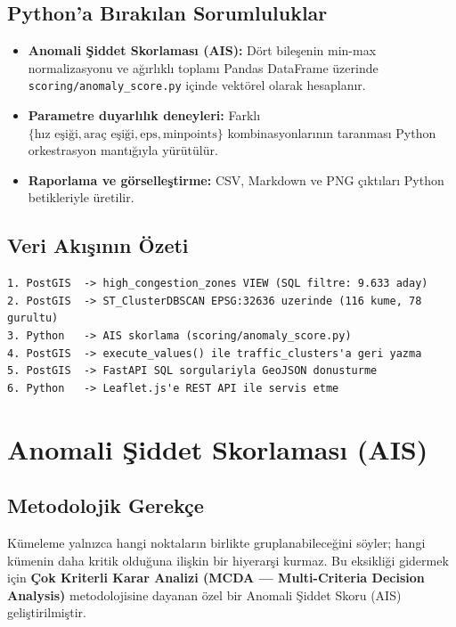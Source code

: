 \documentclass[12pt,a4paper]{article}
\begin{document}
\subsection{Python'a Bırakılan Sorumluluklar}

\begin{itemize}
    \item \textbf{Anomali Şiddet Skorlaması (AIS):} Dört bileşenin min-max normalizasyonu ve ağırlıklı toplamı Pandas DataFrame üzerinde \texttt{scoring/anomaly\_score.py} içinde vektörel olarak hesaplanır.
    \item \textbf{Parametre duyarlılık deneyleri:} Farklı $\{\text{hız eşiği}, \text{araç eşiği}, \text{eps}, \text{minpoints}\}$ kombinasyonlarının taranması Python orkestrasyon mantığıyla yürütülür.
    \item \textbf{Raporlama ve görselleştirme:} CSV, Markdown ve PNG çıktıları Python betikleriyle üretilir.
\end{itemize}

\subsection{Veri Akışının Özeti}

\begin{lstlisting}[language={}, numbers=none, caption={Hibrit mimarinin veri akisi}]
1. PostGIS  -> high_congestion_zones VIEW (SQL filtre: 9.633 aday)
2. PostGIS  -> ST_ClusterDBSCAN EPSG:32636 uzerinde (116 kume, 78 gurultu)
3. Python   -> AIS skorlama (scoring/anomaly_score.py)
4. PostGIS  -> execute_values() ile traffic_clusters'a geri yazma
5. PostGIS  -> FastAPI SQL sorgulariyla GeoJSON donusturme
6. Python   -> Leaflet.js'e REST API ile servis etme
\end{lstlisting}

\section{Anomali Şiddet Skorlaması (AIS)}
\label{sec:ais}

\subsection{Metodolojik Gerekçe}

Kümeleme yalnızca hangi noktaların birlikte gruplanabileceğini söyler; hangi kümenin daha kritik olduğuna ilişkin bir hiyerarşi kurmaz. Bu eksikliği gidermek için \textbf{Çok Kriterli Karar Analizi (MCDA — Multi-Criteria Decision Analysis)} metodolojisine dayanan özel bir Anomali Şiddet Skoru (AIS) geliştirilmiştir.
\end{document}
